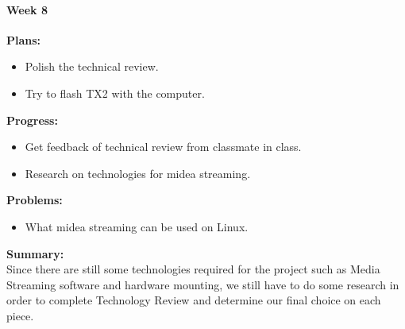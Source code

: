 \paragraph{Week 8}
\begin{adjustwidth}{2.5em}{0pt}
    \vspace{-0.5cm}\textbf{Plans:}
    \vspace{-0.5cm}
    \begin{itemize}
        \item Polish the technical review.
        \item Try to flash TX2 with the computer.
    \end{itemize} 
    \vspace{-0.3cm}\textbf{Progress:}
    \vspace{-0.5cm}
    \begin{itemize}
        \item Get feedback of technical review from classmate in class.
        \item Research on technologies for midea streaming.
    \end{itemize} 
    \vspace{-0.3cm}\textbf{Problems:}
    \vspace{-0.5cm}
    \begin{itemize}
        \item What midea streaming can be used on Linux.
    \end{itemize}  
    \vspace{-0.3cm}\noindent\textbf{Summary:}\\
    \noindent Since there are still some technologies required for the project such as Media Streaming 
    software and hardware mounting, we still have to do some research in order to complete Technology 
    Review and determine our final choice on each piece. \\
\end{adjustwidth} 


